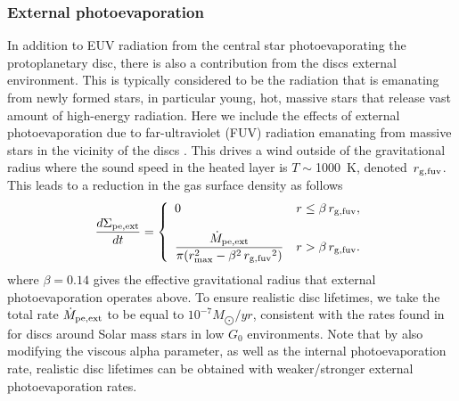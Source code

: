 \documentclass[a4paper,fleqn,usenatbib]{mnras}
\newcommand{\rgfuv}{{\, {r_{\rm g, fuv}}}}
\begin{document}
\subsubsection{External photoevaporation}
In addition to EUV radiation from the central star photoevaporating the protoplanetary disc, there is also a contribution from the discs external environment.
This is typically considered to be the radiation that is emanating from newly formed stars, in particular young, hot, massive stars that release vast amount of high-energy radiation.
Here we include the effects of external photoevaporation due to far-ultraviolet (FUV) radiation emanating from massive stars in the vicinity of the discs \citep{Matsuyama03}.
This drives a wind outside of the gravitational radius where the sound speed in the heated layer is $T\sim$1000~K, denoted $\rgfuv$.
This leads to a reduction in the gas surface density as follows \citep{Matsuyama03}
\begin{equation}
\dfrac{d\Sigma_{\rm pe,ext}}{dt} =  \left\{ \begin{array}{ll}
0 & r\le \beta \rgfuv , \\
\\
\dfrac{\dot{M}_{\rm pe,ext}}{\pi(r_{\rm max}^2-\beta^2 \rgfuv^2)}& r>\beta \rgfuv.
\end{array} \right.
\end{equation}
where $\beta = 0.14$ \citep[similar to][]{AlexanderPascucci12} gives the effective gravitational radius that external photoevaporation operates above.
To ensure realistic disc lifetimes, we take the total rate $\dot{M}_{\rm pe,ext}$ to be equal to $10^{-7} M_{\bigodot}/yr$, consistent with the rates found in \citet{Haworth18} for discs around Solar mass stars in low $G_0$ environments.
Note that by also modifying the viscous alpha parameter, as well as the internal photoevaporation rate, realistic disc lifetimes can be obtained with weaker/stronger external photoevaporation rates.
\end{document}
